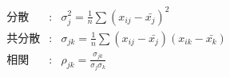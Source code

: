 \begin{eqnarray}
	\mbox{分散} &:& \sigma_{j}^2 = \frac{1}{n}\sum (x_{ij} -\bar{x_j})^2 \\
	\mbox{共分散} &:& \sigma_{jk} = \frac{1}{n}\sum (x_{ij} - \bar{x_j})(x_{ik} - \bar{x_k}) \\
	\mbox{相関} &:& \rho_{jk} = \frac{\sigma_{jk}}{\sigma_j\sigma_k}
\end{eqnarray}
